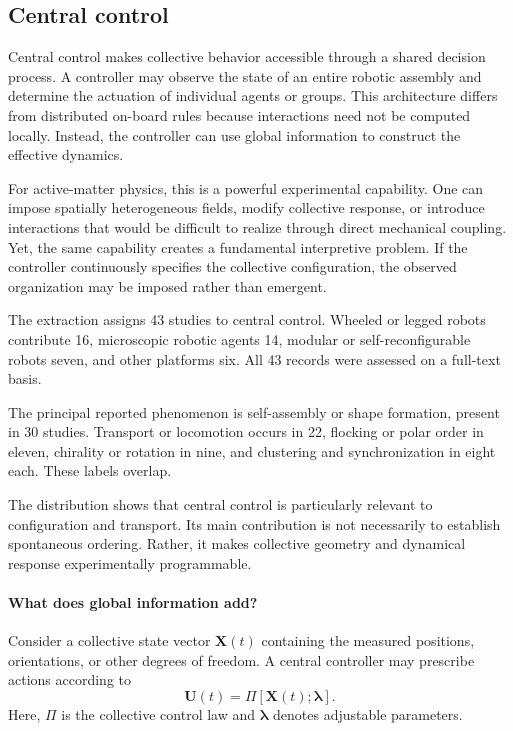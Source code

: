 \subsection{Central control}
\label{sec:control-central}

Central control makes collective behavior accessible through
a shared decision process. A controller may observe the state
of an entire robotic assembly and determine the actuation
of individual agents or groups. This architecture differs
from distributed on-board rules because interactions need
not be computed locally. Instead, the controller can use
global information to construct the effective dynamics.

For active-matter physics, this is a powerful experimental
capability. One can impose spatially heterogeneous fields,
modify collective response, or introduce interactions that
would be difficult to realize through direct mechanical
coupling. Yet, the same capability creates a fundamental
interpretive problem. If the controller continuously
specifies the collective configuration, the observed
organization may be imposed rather than emergent.

The extraction assigns 43 studies to central control.
Wheeled or legged robots contribute 16, microscopic
robotic agents 14, modular or self-reconfigurable
robots seven, and other platforms six. All 43
records were assessed on a full-text basis.

The principal reported phenomenon is self-assembly
or shape formation, present in 30 studies.
Transport or locomotion occurs in 22,
flocking or polar order in eleven,
chirality or rotation in nine,
and clustering and synchronization
in eight each. These labels overlap.

The distribution shows that central control is
particularly relevant to configuration and
transport. Its main contribution is not
necessarily to establish spontaneous ordering.
Rather, it makes collective geometry and
dynamical response experimentally programmable.

\paragraph*{What does global information add?}

Consider a collective state vector
$\mathbf X(t)$ containing the measured
positions, orientations, or other
degrees of freedom. A central controller
may prescribe actions according to
\begin{equation}
\mathbf U(t)=
\Pi\!\left[
\mathbf X(t);
\boldsymbol{\lambda}
\right].
\label{eq:control-central-policy}
\end{equation}
Here, $\Pi$ is the collective control
law and $\boldsymbol{\lambda}$ denotes
adjustable parameters.

